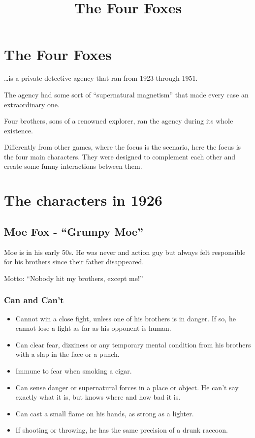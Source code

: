 \documentclass[11pt]{article}
\title{The Four Foxes}
\begin{document}
\tableofcontents

\maketitle

\section{The Four Foxes}
\label{sec:intro}
\dots is a private detective agency that ran from 1923 through 1951.

The agency had some sort of \enquote{supernatural magnetism} that made every case an extraordinary one.

Four brothers, sons of a renowned explorer, ran the agency during its whole existence.

Differently from other games, where the focus is the scenario, here the focus is the four main characters. They were designed to complement each other and create some funny interactions between them.

\section{The characters in 1926}
\label{sec:characters}

\subsection{Moe Fox - \enquote{Grumpy Moe}}
\label{sec:moe}
Moe is in his early 50s. He was never and action guy but always felt responsible for his brothers since their father disappeared.

Motto: \enquote{Nobody hit my brothers, except me!}

\subsubsection{Can and Can't}
\label{sec:moe-can}
\begin{itemize}
\item Cannot win a close fight, unless one of his brothers is in danger. If so, he cannot lose a fight as far as his opponent is human.
\item Can clear fear, dizziness or any temporary mental condition from his brothers with a slap in the face or a punch.
\item Immune to fear when smoking a cigar.
\item Can sense danger or supernatural forces in a place or object. He can't say exactly what it is, but knows where and how bad it is.
\item Can cast a small flame on his hands, as strong as a lighter.
\item If shooting or throwing, he has the same precision of a drunk raccoon.
\end{itemize}
\end{document}
